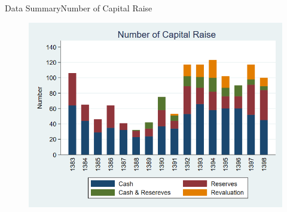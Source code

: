 \documentclass{beamer}
\begin{document}
\begin{frame}{Data Summary}{Number of Capital Raise}
\begin{figure}
\centering
\includegraphics[width=0.7\linewidth]{Number2.png}
\label{fig:number2}
\end{figure}

\end{frame}


%
%
%
%
%
%
%
%
%
%
%
\end{document}
